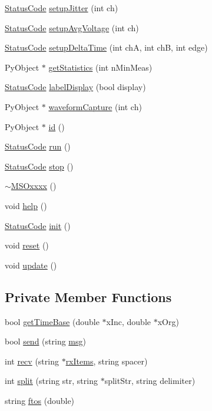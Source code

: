 \begin{DoxyCompactItemize}
\hyperlink{classStatusCode}{Status\+Code} \hyperlink{classMSOxxxx_a829d87b0aa03840ebfe0a44e560c7f63}{setup\+Jitter} (int ch)
\item 
\hyperlink{classStatusCode}{Status\+Code} \hyperlink{classMSOxxxx_af1524bb099b5e559931704d13a1f1126}{setup\+Avg\+Voltage} (int ch)
\item 
\hyperlink{classStatusCode}{Status\+Code} \hyperlink{classMSOxxxx_abbbebb3e4649c866bcdd853627f12b5d}{setup\+Delta\+Time} (int chA, int chB, int edge)
\item 
Py\+Object $\ast$ \hyperlink{classMSOxxxx_a38f15b6ad8bc3cdc1836d784b3e96c59}{get\+Statistics} (int n\+Min\+Meas)
\item 
\hyperlink{classStatusCode}{Status\+Code} \hyperlink{classMSOxxxx_ade4192f09f150be8b9c7c081ce1a1870}{label\+Display} (bool display)
\item 
Py\+Object $\ast$ \hyperlink{classMSOxxxx_aed78c680bcec9e14a88eedf7b291518c}{waveform\+Capture} (int ch)
\item 
Py\+Object $\ast$ \hyperlink{classMSOxxxx_a0f14b23d31d8e7647184e99a89600cc3}{id} ()
\item 
\hyperlink{classStatusCode}{Status\+Code} \hyperlink{classMSOxxxx_a96ca34744e5a6b611aaf9ae7910f00cd}{run} ()
\item 
\hyperlink{classStatusCode}{Status\+Code} \hyperlink{classMSOxxxx_a4ec991c3850a652fbe9a1709cab7001b}{stop} ()
\item 
\hyperlink{classMSOxxxx_a567c156d78fbeab9d61bf8ec9acac851}{$\sim$\+M\+S\+Oxxxx} ()
\item 
void \hyperlink{classMSOxxxx_a8c22ff23297ada963eaf12b6e0b62017}{help} ()
\item 
\hyperlink{classStatusCode}{Status\+Code} \hyperlink{classMSOxxxx_ac14ed16b221798423e7c3b5e285006b5}{init} ()
\item 
void \hyperlink{classMSOxxxx_a26f03d21da556529155898dc115c301c}{reset} ()
\item 
void \hyperlink{classMSOxxxx_a09452d6e75cd9adfaec93606fbb998dc}{update} ()
\end{DoxyCompactItemize}
\subsection*{Private Member Functions}
\begin{DoxyCompactItemize}
\item 
bool \hyperlink{classMSOxxxx_a9723e9234403d5eb74bde628fd78d56c}{get\+Time\+Base} (double $\ast$x\+Inc, double $\ast$x\+Org)
\item 
bool \hyperlink{classMSOxxxx_ae77668a1ae4ccb74e0ed5f2485dfdebf}{send} (string \hyperlink{classObject_a58b2d0618c2d08cf2383012611528d97}{msg})
\item 
int \hyperlink{classMSOxxxx_aa02e46a61e287ef1f5377e9e42399faf}{recv} (string $\ast$\hyperlink{classMSOxxxx_a847cae37181e9ec5f481edcc3fb19b1a}{rx\+Items}, string spacer)
\item 
int \hyperlink{classMSOxxxx_a46726c6d181a758bb4f598c66f336236}{split} (string str, string $\ast$split\+Str, string delimiter)
\item 
string \hyperlink{classMSOxxxx_ab9c897c3dc0a52cbe5a5da67fc520ed7}{ftos} (double)
\end{DoxyCompactItemize}

